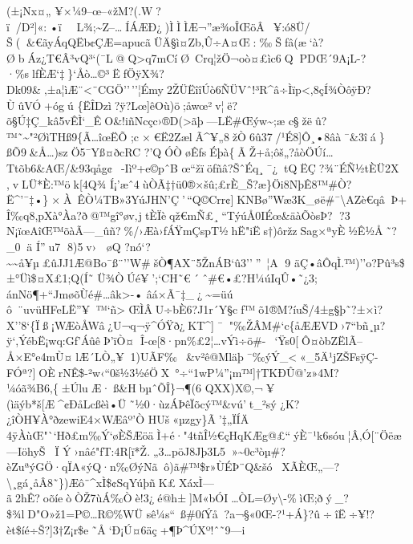 (±¡Nx¤„
¥×¼9--œ--«žM?(.W?ï/D²{]}«:•ï~L¾;\textasciitilde Z--\ldotsÍÁÆÐ¿)ÌÌÌÆ¬''æ¾oÎŒöÂ~¥:ó8Ü/Š(\&€ãyÁqQËb¢ÇÆ=apucãÜÄ §ì¤Zb‚Û÷­A¤Œ:‰Šfâ(æ`à?ØbÁz¿T€Â³vQ³`(¯L@Q\textgreater q7mCíØ~Crq¦žÖ¬oò¤£ìc6QPDŒ´9A¡L-?·\%slƒÈÆ`‡\}`Åò\ldots©³ËfÖÿX¾?Dk09\&‚±\textbar a¦ìÆ\textbar@¨\textless¨CGÖ''\,''¦Émy2ŽÜËîîÚò6ÑÜVˆ!³R\^{}â÷Ìïp\textless,8çÍ¾ÒôÿÐ?ÙûVÓ+ógú
\{ËÎDzì?ÿ?Lœ{]}êOù)ö;åwœ²v¦ë?õ§Ú‡Ç\_kâ5vÊÌ`\_ÊO\&!iñNcçc›®D(\textgreater ãþ---LË\#Œýw\textasciitilde;æ
c§žëû?™˜\textasciitilde"²ØìTHß9\{Ã\ldots îœËÕ
;c ×€Ë2ZælÃ\^{}¥„8žÒ6û37/¹É8{]}Ô¸•8âà¯\&3îá\}ßÕ9\&Å\ldots)szÖ5¯Yß¤ðcRC
?'QÓÒøÊfsÉþà\{ÃŽ+å;ôš„?åòÖÚí\ldots Ttõb6\&AŒ/\&93qåg¢\textbar~-Iìº+e©pˆB
œ``žïöƒñâ?ŠˆÉq¸¯¿tQËÇ\textbar?¾¨ÉÑ½tÈÜ2X ,vLÜ*È:™ök{[}4Q¾
Í¡'æˆ4ùÒÃ‡†ü0®×šû;£rÈ\_Š?æ\}Öi8NþÊ8™\#Ò?Ë\^{}'¯‡•\}×\textbarÀ~ÊÒ¼TB»3YúJHN'Ç'\,``Q©Crr¢{]}KNBø''Wæ3K\_øë\#¯\textbackslash AZè€qâÞ+Î‰q8,pXà°Àa?ð@™gî°øv‚jtÈÏèqž€mÑ£¸``TýúÅ0IÉœ\&äàÕòsÞ?
?3
N¡ïœAîŒ™õàÃ---\_ûñ?\%/›Æà›fÁŸmÇspT½\textquotesingle hË"iËs†)ôržzSag×ªyÈ½Ê½Å˜?\_0ä
Í''u7 8)5v› øQ
?nó`?\textasciitilde\textasciitilde å¥\textquotesingle µ£ûJJ1Æ@Bo¯ß¨''W\#šÒ¶AX¨5ŽnÁB­`û3''''~¦A
9 äÇ•âÔqÌ.™)''o?Pû³s\$±°Üì\$¤X£1;Q(Í˜ Ü¾ÒÚé¥';`CH˜€´ˆ\#€•£?H¼úIqÛ•˜¿3;
ánNö¶+``JmøõÙé\#\ldots âk\textgreater-• âá×Ã¯‡\_¿\textasciitilde=üú
ô~¨uvüHFeLË''¥™`ñ\textgreaterŒÌÂU÷bÈ6?J1r´Y§cƒ™õ1®M?íuŠ/4±g§þ˜?±×ì?X''8`\{Ïß¡WÆòÅWâ¿U¬q¬ÿ\^{}ÓŸð¿KT\^{}{]}¯"‰ŽÂM\#`\textbar c\{åÆÆVD›7``bñ¸µ?ÿ`,ÝébË¡wq:Gƒ'\textquotesingle ÁûêÞ'ïÒ¤ Î-œ{[}8·pn\%£2¦\ldots vÝì÷ö\#-~`Ÿs0{[}Ô¤òbZËlÃ--Å×E°e4mÙ¤lÆ´LÒ„¥1)UÃF‰~\&v²ê@Mläþ¯‰ýÝ\_\textless«\_5Ä¹jZŠFsÿÇ­FÓª?{]}OÈrNÊ\$-²w‹``0š½3½éÖX~°÷``1wP¼''¡m™{]}†TKÐÛ@'z»4M?\textbar¼óã¾B6‚\{±ÚluÆ·ß\&HbµˆÕÎ\}¬¶(6
QXX)X©,¬¥(ìäýb*š{[}Æ\^{}¢ÐåLcßè\textquotesingle ì•Ü˜½0·ùzÁÞêÏõcý™\&vú't\_²sý
¿K\textbar?¿îÒH¥À°ðzewiE4×WÆâº'Ò HUš«µzgy\}Ã'‡„ÏÍ\textquotesingle Ä
4ÿÀùŒ"``Hð£m‰Ý`øÈŠÆöäÌ+é·"4tñÎ½€çHqKÆg@£``ýÈ¯¹k6sóu¦Â‚Ó{[}¨Öëæ---IöhyŠ\textquotesingleÏ
Ý›nâé"ƒT:4R{[}ï*Ž.„3\ldots pöJ8Jþ3L5»\textasciitilde0c³òµ\#?èZuªýGÖ·qÏA«ýQ·n‰ØýNãô)ã\#™\$r»ÙÉÞ¨Q\&šóXÃÈŒ„---?\textbackslash¸gá¸åÂ8˜\})Æô¨\^{}­xÌ\$¢SqYúþñK£XáxÌ---ã2hÊ?oõíeòÒŽ7\textbar ùÁ‰Òè!3¿é@h±{]}M«bÓI\ldots ÒL\textquotesingle=Øy\textbackslash-\%ìŒ;ðý\_?\$¾lD"O»ž1=P©\ldots R©\%WÜ
sê¼s``~ß\#0íÝå?a¬§«0Œ-?¹+Á\}?û÷îË÷¥!?èt\$íé÷Š?{]}3\textquotesingle†Z¡r\$e˜Å`Ð¡Ú¤6äç+¶Þ\^{}ÚXº!ˆ˜9---i

